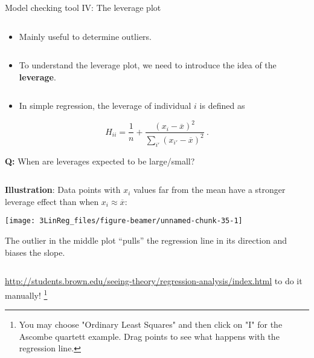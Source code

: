 \documentclass[10pt,ignorenonframetext,]{beamer}
\providecommand{\tightlist}{%
  \setlength{\itemsep}{0pt}\setlength{\parskip}{0pt}}
\begin{document}
\begin{frame}

\begin{block}{Model checking tool IV: The leverage plot}

\(~\)

\begin{itemize}
\tightlist
\item
  Mainly useful to determine outliers.
\end{itemize}

\(~\)

\begin{itemize}
\tightlist
\item
  To understand the leverage plot, we need to introduce the idea of the
  \textbf{leverage}.
\end{itemize}

\(~\)

\begin{itemize}
\tightlist
\item
  In simple regression, the leverage of individual \(i\) is defined as
\end{itemize}

\begin{equation} 
H_{ii} = \frac{1}{n} + \frac{(x_i-\overline{x})^2}{\sum_{i'}(x_{i'}-\overline{x})^2} \ . 
\end{equation}

\vspace{7mm}

\textbf{Q:} When are leverages expected to be large/small?

\(~\)

\end{block}

\end{frame}

\begin{frame}

\textbf{Illustration}: Data points with \(x_i\) values far from the mean
have a stronger leverage effect than when \(x_i\approx \overline{x}\):

\begin{center}\texttt{[image: 3LinReg\_files/figure-beamer/unnamed-chunk-35-1]} \end{center}

The outlier in the middle plot ``pulls'' the regression line in its
direction and biases the slope.

\(~\)

\href{http://students.brown.edu/seeing-theory/regression-analysis/index.html}{http://students.brown.edu/seeing-theory/regression-analysis/index.html}
to do it manually!
\footnote{You may choose "Ordinary Least Squares" and then click on "I" for the Ascombe quartett example. Drag points to see what happens with the regression line.}

\end{frame}
\end{document}
